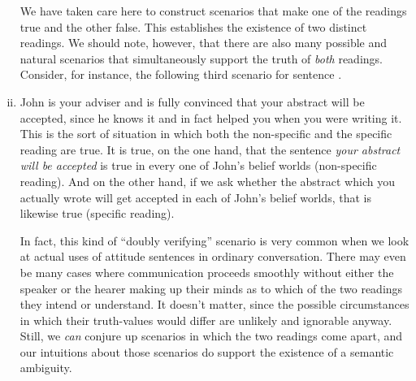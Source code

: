 \begin{enumerate}[(i)]
	We have taken care here to construct scenarios that make one of the readings
  true and the other false. This establishes the existence of two distinct
  readings. We should note, however, that there are also many possible and
  natural scenarios that simultaneously support the truth of \emph{both}
  readings. Consider, for instance, the following third scenario for sentence
  \Last.
	
\item John is your adviser and is fully convinced that your abstract will be
  accepted, since he knows it and in fact helped you when you were writing it.
  This is the sort of situation in which both the non-specific and the specific
  reading are true. It is true, on the one hand, that the sentence \emph{your
    abstract will be accepted} is true in every one of John's belief worlds
  (non-specific reading). And on the other hand, if we ask whether the abstract
  which you actually wrote will get accepted in each of John's belief worlds,
  that is likewise true (specific reading).
	
	In fact, this kind of ``doubly verifying'' scenario is very common when we
  look at actual uses of attitude sentences in ordinary conversation. There may
  even be many cases where communication proceeds smoothly without either the
  speaker or the hearer making up their minds as to which of the two readings
  they intend or understand. It doesn't matter, since the possible circumstances
  in which their truth-values would differ are unlikely and ignorable anyway.
  Still, we \emph{can} conjure up scenarios in which the two readings come
  apart, and our intuitions about those scenarios do support the existence of a
  semantic ambiguity.
  
\end{enumerate}

